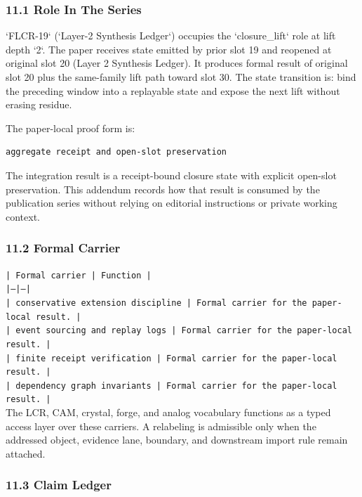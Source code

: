 \documentclass[11pt]{article}
\begin{document}
\subsubsection*{11.1 Role In The Series}

`FLCR-19` (`Layer-2 Synthesis Ledger`) occupies the `closure\_lift` role at lift depth `2`.
The paper receives state emitted by prior slot 19 and reopened at original slot 20 (Layer 2 Synthesis Ledger). It produces formal result of original slot 20 plus the same-family lift path toward slot 30. The state transition is:
bind the preceding window into a replayable state and expose the next lift without erasing residue.

The paper-local proof form is:

\begin{verbatim}
aggregate receipt and open-slot preservation
\end{verbatim}

The integration result is a receipt-bound closure state with explicit open-slot preservation. This addendum records how that result is
consumed by the publication series without relying on editorial instructions or
private working context.

\subsubsection*{11.2 Formal Carrier}

\noindent\texttt{| Formal carrier | Function |}\\
\noindent\texttt{|---|---|}\\
\noindent\texttt{| conservative extension discipline | Formal carrier for the paper-local result. |}\\
\noindent\texttt{| event sourcing and replay logs | Formal carrier for the paper-local result. |}\\
\noindent\texttt{| finite receipt verification | Formal carrier for the paper-local result. |}\\
\noindent\texttt{| dependency graph invariants | Formal carrier for the paper-local result. |}\\

The LCR, CAM, crystal, forge, and analog vocabulary functions as a typed access
layer over these carriers. A relabeling is admissible only when the addressed
object, evidence lane, boundary, and downstream import rule remain attached.

\subsubsection*{11.3 Claim Ledger}
\end{document}
